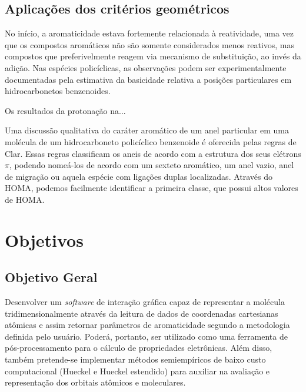 \section{Aplicações dos critérios geométricos}

No início, a aromaticidade estava fortemente relacionada à reatividade, uma vez que os compostos aromáticos não são somente considerados menos reativos, mas compostos que preferivelmente reagem via mecanismo de substituição, ao invés da adição. Nas espécies policíclicas, as observações podem ser experimentalmente documentadas pela estimativa da basicidade relativa a posições particulares em hidrocarbonetos benzenoides.

Os resultados da protonação na...

Uma discussão qualitativa do caráter aromático de um anel particular em uma molécula de um hidrocarboneto policíclico benzenoide é oferecida pelas regras de Clar. Essas regras classificam os aneis de acordo com a estrutura dos seus elétrons $\pi$, podendo nomeá-los de acordo com um sexteto aromático, um anel vazio, anel de migração ou aquela espécie com ligações duplas localizadas. Através do HOMA, podemos facilmente identificar a primeira classe, que possui altos valores de HOMA.

\chapter{Objetivos}

\section{Objetivo Geral}

 Desenvolver um \textit{software} de interação gráfica capaz de representar a molécula tridimensionalmente através da leitura de dados de coordenadas cartesianas atômicas e assim retornar parâmetros de aromaticidade segundo a metodologia definida pelo usuário. Poderá, portanto, ser utilizado como uma ferramenta de pós-processamento para o cálculo de propriedades eletrônicas. Além disso, também pretende-se implementar métodos semiempíricos de baixo custo computacional (Hueckel e Hueckel estendido) para auxiliar na avaliação e representação dos orbitais atômicos e moleculares.

